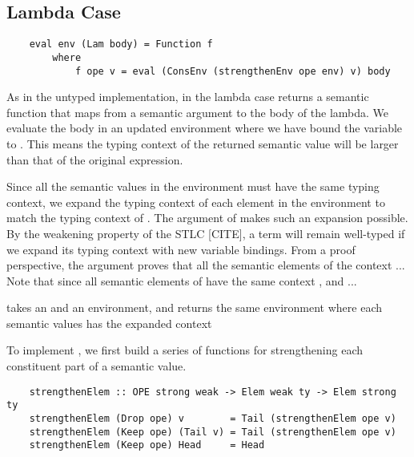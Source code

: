 
\subsection{Lambda Case}

\begin{lstlisting}
    eval env (Lam body) = Function f 
        where
            f ope v = eval (ConsEnv (strengthenEnv ope env) v) body
\end{lstlisting}

As in the untyped implementation, in the lambda case  returns a semantic function that maps from a semantic argument  to the body of the lambda. We evaluate the body in an updated environment where we have bound the variable  to . This means the typing context of the returned semantic value will be larger than that of the original expression.


Since all the semantic values in the environment must have the same typing context, we expand the typing context of each element in the environment to match the typing context  of . The  argument of  makes such an expansion possible. By the weakening property of the STLC [CITE], a term will remain well-typed if we expand its typing context with new variable bindings. From a proof perspective, the  argument proves that all the semantic elements of the context  ... 
Note that since all semantic elements of  have the same context , and  ...


 takes an  and an environment, and returns the same environment where each semantic values has the expanded context 

To implement , we first build a series of functions for strengthening each constituent part of a semantic value.

\begin{lstlisting}
    strengthenElem :: OPE strong weak -> Elem weak ty -> Elem strong ty
    strengthenElem (Drop ope) v        = Tail (strengthenElem ope v)
    strengthenElem (Keep ope) (Tail v) = Tail (strengthenElem ope v)
    strengthenElem (Keep ope) Head     = Head
\end{lstlisting}


